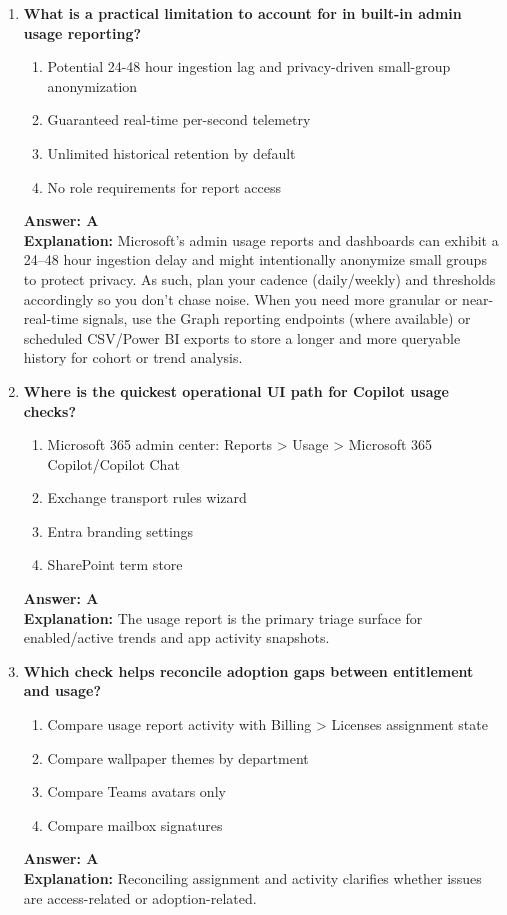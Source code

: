 \documentclass[10pt]{article}
\begin{document}
\begin{enumerate}[leftmargin=*]
\item \textbf{What is a practical limitation to account for in built-in admin usage reporting?}
\begin{enumerate}[label=\Alph*.]
  \item Potential 24-48 hour ingestion lag and privacy-driven small-group anonymization
  \item Guaranteed real-time per-second telemetry
  \item Unlimited historical retention by default
  \item No role requirements for report access
\end{enumerate}
\textbf{Answer: A}\\
\textbf{Explanation:} Microsoft’s admin usage reports and dashboards can exhibit a 24–48 hour ingestion delay and might intentionally anonymize small groups to protect privacy. As such, plan your cadence (daily/weekly) and thresholds accordingly so you don’t chase noise. When you need more granular or near-real-time signals, use the Graph reporting endpoints (where available) or scheduled CSV/Power BI exports to store a longer and more queryable history for cohort or trend analysis.

\item \textbf{Where is the quickest operational UI path for Copilot usage checks?}
\begin{enumerate}[label=\Alph*.]
  \item Microsoft 365 admin center: Reports > Usage > Microsoft 365 Copilot/Copilot Chat
  \item Exchange transport rules wizard
  \item Entra branding settings
  \item SharePoint term store
\end{enumerate}
\textbf{Answer: A}\\
\textbf{Explanation:} The usage report is the primary triage surface for enabled/active trends and app activity snapshots.

\item \textbf{Which check helps reconcile adoption gaps between entitlement and usage?}
\begin{enumerate}[label=\Alph*.]
  \item Compare usage report activity with Billing > Licenses assignment state
  \item Compare wallpaper themes by department
  \item Compare Teams avatars only
  \item Compare mailbox signatures
\end{enumerate}
\textbf{Answer: A}\\
\textbf{Explanation:} Reconciling assignment and activity clarifies whether issues are access-related or adoption-related.


\end{enumerate}
\end{document}
